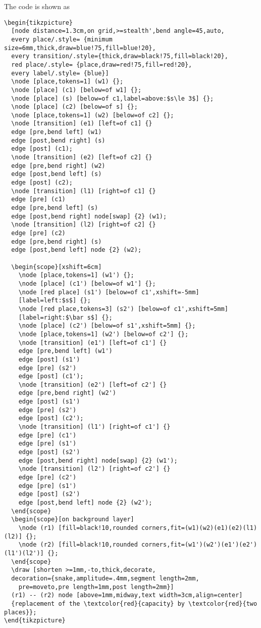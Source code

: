 \documentclass[koma,a4paper,utopia,12pt,listings-color,microtype,paralist,colorlinks,urlcolor=red]{org-article}
\begin{document}
The code is shown as
\lstset{language=[LaTeX]TeX,label= ,caption= ,captionpos=b,firstnumber=1,numbers=left}
\begin{lstlisting}
\begin{tikzpicture}
  [node distance=1.3cm,on grid,>=stealth',bend angle=45,auto,
  every place/.style= {minimum size=6mm,thick,draw=blue!75,fill=blue!20},
  every transition/.style={thick,draw=black!75,fill=black!20},
  red place/.style= {place,draw=red!75,fill=red!20},
  every label/.style= {blue}]
  \node [place,tokens=1] (w1) {};
  \node [place] (c1) [below=of w1] {};
  \node [place] (s) [below=of c1,label=above:$s\le 3$] {};
  \node [place] (c2) [below=of s] {};
  \node [place,tokens=1] (w2) [below=of c2] {};
  \node [transition] (e1) [left=of c1] {}
  edge [pre,bend left] (w1)
  edge [post,bend right] (s)
  edge [post] (c1);
  \node [transition] (e2) [left=of c2] {}
  edge [pre,bend right] (w2)
  edge [post,bend left] (s)
  edge [post] (c2);
  \node [transition] (l1) [right=of c1] {}
  edge [pre] (c1)
  edge [pre,bend left] (s)
  edge [post,bend right] node[swap] {2} (w1);
  \node [transition] (l2) [right=of c2] {}
  edge [pre] (c2)
  edge [pre,bend right] (s)
  edge [post,bend left] node {2} (w2);

  \begin{scope}[xshift=6cm]
    \node [place,tokens=1] (w1') {};
    \node [place] (c1') [below=of w1'] {};
    \node [red place] (s1') [below=of c1',xshift=-5mm]
    [label=left:$s$] {};
    \node [red place,tokens=3] (s2') [below=of c1',xshift=5mm]
    [label=right:$\bar s$] {};
    \node [place] (c2') [below=of s1',xshift=5mm] {};
    \node [place,tokens=1] (w2') [below=of c2'] {};
    \node [transition] (e1') [left=of c1'] {}
    edge [pre,bend left] (w1')
    edge [post] (s1')
    edge [pre] (s2')
    edge [post] (c1');
    \node [transition] (e2') [left=of c2'] {}
    edge [pre,bend right] (w2')
    edge [post] (s1')
    edge [pre] (s2')
    edge [post] (c2');
    \node [transition] (l1') [right=of c1'] {}
    edge [pre] (c1')
    edge [pre] (s1')
    edge [post] (s2')
    edge [post,bend right] node[swap] {2} (w1');
    \node [transition] (l2') [right=of c2'] {}
    edge [pre] (c2')
    edge [pre] (s1')
    edge [post] (s2')
    edge [post,bend left] node {2} (w2');
  \end{scope}
  \begin{scope}[on background layer]
    \node (r1) [fill=black!10,rounded corners,fit=(w1)(w2)(e1)(e2)(l1)(l2)] {};
    \node (r2) [fill=black!10,rounded corners,fit=(w1')(w2')(e1')(e2')(l1')(l2')] {};
  \end{scope}
  \draw [shorten >=1mm,-to,thick,decorate,
  decoration={snake,amplitude=.4mm,segment length=2mm,
    pre=moveto,pre length=1mm,post length=2mm}]
  (r1) -- (r2) node [above=1mm,midway,text width=3cm,align=center]
  {replacement of the \textcolor{red}{capacity} by \textcolor{red}{two places}};
\end{tikzpicture}
\end{lstlisting}
\end{document}
